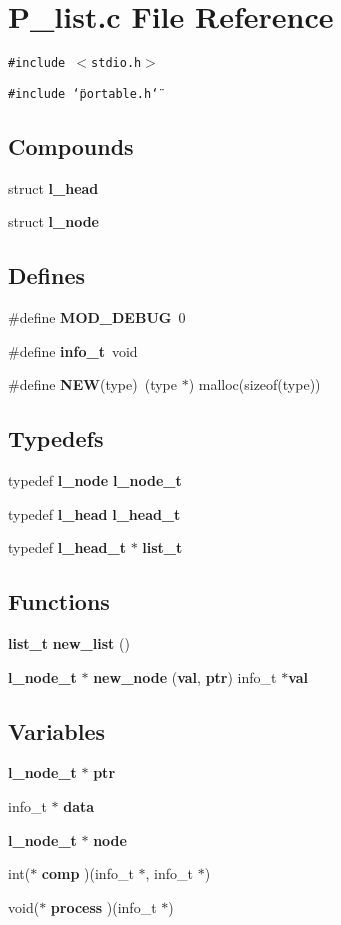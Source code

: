 \section{P\_\-list.c File Reference}
\label{P__list_8c}
{\tt \#include $<$stdio.h$>$}\par
{\tt \#include \char`\"{}portable.h\char`\"{}}\par
\subsection*{Compounds}
\begin{CompactItemize}
\item 
struct {\bf l\_\-head}
\item 
struct {\bf l\_\-node}
\end{CompactItemize}
\subsection*{Defines}
\begin{CompactItemize}
\item 
\#define {\bf MOD\_\-DEBUG}\ 0
\item 
\#define {\bf info\_\-t}\ void
\item 
\#define {\bf NEW}(type)\ (type $\ast$) malloc(sizeof(type))
\end{CompactItemize}
\subsection*{Typedefs}
\begin{CompactItemize}
\item 
typedef {\bf l\_\-node} {\bf l\_\-node\_\-t}
\item 
typedef {\bf l\_\-head} {\bf l\_\-head\_\-t}
\item 
typedef {\bf l\_\-head\_\-t} $\ast$ {\bf list\_\-t}
\end{CompactItemize}
\subsection*{Functions}
\begin{CompactItemize}
\item 
{\bf list\_\-t} {\bf new\_\-list} ()
\item 
{\bf l\_\-node\_\-t} $\ast$ {\bf new\_\-node} ({\bf val}, {\bf ptr}) info\_\-t $\ast${\bf val}
\end{CompactItemize}
\subsection*{Variables}
\begin{CompactItemize}
\item 
{\bf l\_\-node\_\-t} $\ast$ {\bf ptr}
\item 
info\_\-t $\ast$ {\bf data}
\item 
{\bf l\_\-node\_\-t} $\ast$ {\bf node}
\item 
int($\ast$ {\bf comp} )(info\_\-t $\ast$, info\_\-t $\ast$)
\item 
void($\ast$ {\bf process} )(info\_\-t $\ast$)
\end{CompactItemize}


